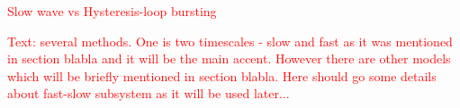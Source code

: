 \documentclass[12pt]{article}
\begin{document}
\noindent\hrulefill


\noindent\hrulefill

\newpage

\textcolor{red}{Slow wave vs Hysteresis-loop bursting}

\FloatBarrier


\FloatBarrier

\noindent\hrulefill


\noindent\hrulefill



\noindent\hrulefill



\noindent\hrulefill



\noindent\hrulefill


\textcolor{red}{Text: several methods. One is two timescales - slow and fast as it was mentioned in section blabla and it will be the main accent. However there are other models which will be briefly mentioned in section blabla. Here should go some details about fast-slow subsystem as it will be used later...}

\noindent\hrulefill

\printbibliography
\end{document}
